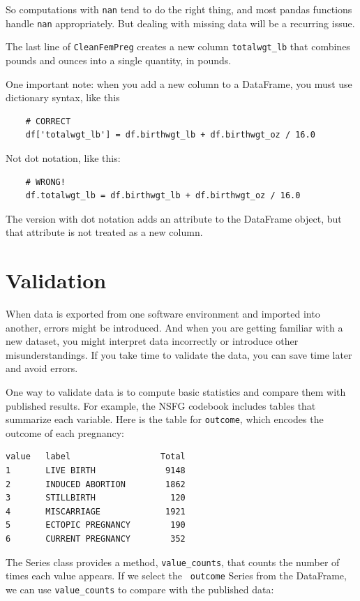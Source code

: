 \documentclass[12pt]{book}
\begin{document}
So computations with {\tt nan} tend to do the right thing, and most
pandas functions handle {\tt nan} appropriately.  But dealing with
missing data will be a recurring issue.

The last line of {\tt CleanFemPreg} creates a new
column \verb"totalwgt_lb" that combines pounds and ounces into
a single quantity, in pounds.

One important note: when you add a new column to a DataFrame, you
must use dictionary syntax, like this

\begin{verbatim}
    # CORRECT
    df['totalwgt_lb'] = df.birthwgt_lb + df.birthwgt_oz / 16.0 
\end{verbatim}

Not dot notation, like this:

\begin{verbatim}
    # WRONG!
    df.totalwgt_lb = df.birthwgt_lb + df.birthwgt_oz / 16.0 
\end{verbatim}

The version with dot notation adds an attribute to the DataFrame
object, but that attribute is not treated as a new column.


\section{Validation}

When data is exported from one software environment and imported into
another, errors might be introduced.  And when you are
getting familiar with a new dataset, you might interpret data
incorrectly or introduce other misunderstandings.  If you take
time to validate the data, you can save time later and avoid errors.

One way to validate data is to compute basic statistics and compare
them with published results.  For example, the NSFG codebook includes
tables that summarize each variable.  Here is the table for
{\tt outcome}, which encodes the outcome of each pregnancy:

\begin{verbatim}
value   label                  Total
1       LIVE BIRTH              9148
2       INDUCED ABORTION        1862
3       STILLBIRTH               120
4       MISCARRIAGE             1921
5       ECTOPIC PREGNANCY        190
6       CURRENT PREGNANCY        352
\end{verbatim}

The Series class provides a method, \verb"value_counts", that
counts the number of times each value appears.  If we select the {\tt
  outcome} Series from the DataFrame, we can use \verb"value_counts"
to compare with the published data:
\end{document}
